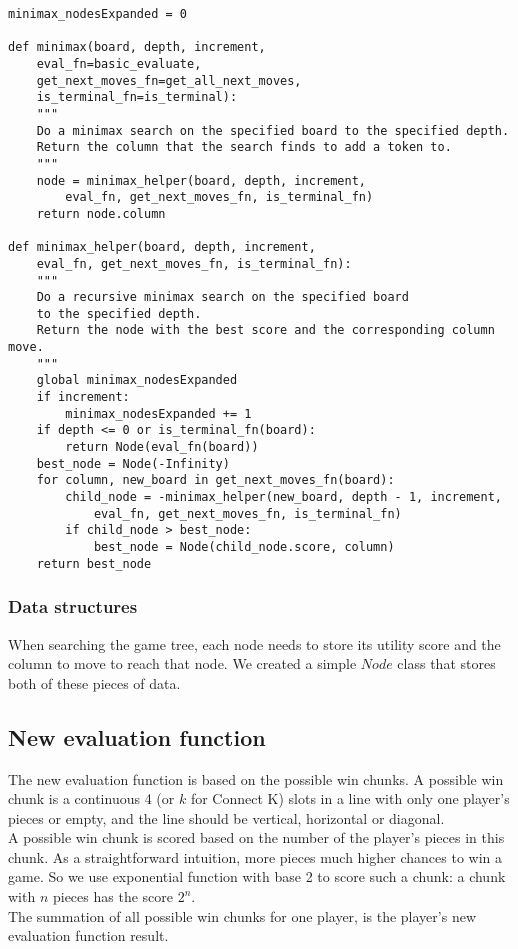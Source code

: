 \documentclass[11pt]{article}
\begin{document}
\lstset{language=Python}
\begin{lstlisting}[frame=single]
minimax_nodesExpanded = 0

def minimax(board, depth, increment,
	eval_fn=basic_evaluate,
	get_next_moves_fn=get_all_next_moves,
	is_terminal_fn=is_terminal):
	"""
	Do a minimax search on the specified board to the specified depth.
	Return the column that the search finds to add a token to.
	"""
	node = minimax_helper(board, depth, increment,
		eval_fn, get_next_moves_fn, is_terminal_fn)
	return node.column

def minimax_helper(board, depth, increment,
	eval_fn, get_next_moves_fn, is_terminal_fn):
	"""
	Do a recursive minimax search on the specified board
	to the specified depth.
	Return the node with the best score and the corresponding column move.
	"""
	global minimax_nodesExpanded
	if increment:
		minimax_nodesExpanded += 1
	if depth <= 0 or is_terminal_fn(board):
		return Node(eval_fn(board))
	best_node = Node(-Infinity)
	for column, new_board in get_next_moves_fn(board):
		child_node = -minimax_helper(new_board, depth - 1, increment,
			eval_fn, get_next_moves_fn, is_terminal_fn)
		if child_node > best_node:
			best_node = Node(child_node.score, column)
	return best_node
\end{lstlisting}

\subsubsection{Data structures}

When searching the game tree, each node needs to store its utility score and
the column to move to reach that node. We created a simple \(Node\) class that
stores both of these pieces of data.

\subsection{New evaluation function}
The new evaluation function is based on the possible win chunks. A possible win chunk is a continuous 4 (or $k$ for Connect K) slots in a line with only one player's pieces or empty, and the line should be vertical, horizontal or diagonal. \\
A possible win chunk is scored based on the number of the player's pieces in this chunk. As a straightforward intuition, more pieces much higher chances to win a game. So we use exponential function with base 2 to score such a chunk: a chunk with $n$ pieces has the score $2^n$. \\
The summation of all possible win chunks for one player, is the player's new evaluation function result.
\end{document}
